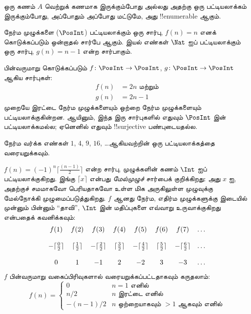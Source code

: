 \documentclass[../../../include/open-logic-section]{subfiles}
\begin{document}
\begin{defn}
ஒரு கணம் $A$ வெற்றுக் கணமாக இருக்கும்போது அல்லது அதற்கு
ஒரு பட்டியலாக்கம் இருக்கும்போது, அப்போதும் அப்போது மட்டுமே,
அது !!{enumerable} ஆகும்.
\end{defn}

\begin{ex}
நேர்ம முழுக்களை ($\PosInt$) பட்டியலாக்கும் ஒரு சார்பு,
$f(n) = n$ எனக் கொடுக்கப்படும் ஒன்றாதல் சார்பே ஆகும்.
இயல் எண்கள் $\Nat$ ஐப் பட்டியலாக்கும் ஒரு சார்பு,
$g(n) = n - 1$ என்ற சார்பாகும்.
\end{ex}

\begin{ex}
பின்வருமாறு கொடுக்கப்படும்
$f\colon \PosInt \to \PosInt$, $g \colon \PosInt \to
\PosInt$ ஆகிய சார்புகள்:
\begin{align*}
f(n) & = 2n \text{ மற்றும்}\\
g(n) & = 2n - 1
\end{align*}
முறையே இரட்டை நேர்ம முழுக்களையும் ஒற்றை நேர்ம முழுக்களையும்
பட்டியலாக்குகின்றன.
ஆயினும், இந்த இரு சார்புகளில் எதுவும் $\PosInt$ இன்
பட்டியலாக்கமல்ல; ஏனெனில் எதுவும் !!{surjective} பண்புடையதல்ல.
\end{ex}

\begin{prob}
நேர்ம வர்க்க எண்கள் $1$, $4$, $9$, $16$, \dots ஆகியவற்றின்
ஒரு பட்டியலாக்கத்தை வரையறுக்கவும்.
\end{prob}

\begin{ex}
$f(n) = (-1)^{n} \lceil \frac{(n-1)}{2}\rceil$ என்ற சார்பு,
முழுக்களின் கணம் $\Int$ ஐப் பட்டியலாக்குகிறது.
இங்கு $\lceil x \rceil$ என்பது \emph{மேல்முழுச்} சார்பைக் குறிக்கிறது:
அது $x$ ஐ, அதற்குச் சமமாகவோ பெரியதாகவோ உள்ள மிக அருகிலுள்ள
முழுவுக்கு மேல்நோக்கி முழுமைப்படுத்துகிறது.
$f$ ஆனது நேர்ம, எதிர்ம முழுக்களுக்கு இடையில் முன்னும் பின்னும்
“தாவி”, $\Int$ இன் மதிப்புகளை எவ்வாறு உருவாக்குகிறது என்பதைக் கவனிக்கவும்:
\[
\begin{array}{c c c c c c c c}
f(1) & f(2) & f(3) & f(4) & f(5) & f(6) & f(7) & \dots \\ \\
- \lceil \tfrac{0}{2} \rceil & \lceil \tfrac{1}{2}\rceil & - \lceil \tfrac{2}{2} \rceil & \lceil \tfrac{3}{2} \rceil & - \lceil \tfrac{4}{2} \rceil  & \lceil \tfrac{5}{2}
\rceil & - \lceil \tfrac{6}{2} \rceil & \dots \\ \\
0 & 1 & -1 & 2 & -2 & 3 & -3 & \dots
\end{array}
\]
$f$ பின்வருமாறு வகைப்பிரிவுகளால் வரையறுக்கப்பட்டதாகவும் கருதலாம்:
\[
f(n) = \begin{cases}
  0 & \text{$n = 1$ எனில்}\\
  n/2 & \text{$n$ இரட்டை எனில்}\\
  -(n-1)/2 & \text{$n$ ஒற்றையாகவும் $>1$ ஆகவும் எனில்}
  \end{cases}
\]
\end{ex}
\end{document}
